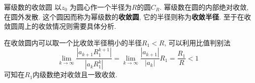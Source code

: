 \documentclass[fontset=windows, chinese, 10pt]{beamer}
\begin{document}
  \begin{frame}{幂级数的收敛圆}
  \small
以$z_0$ 为圆心作一个半径为$R$的圆$C_R$.
幂级数在圆的内部绝对收敛, 在圆外发散. 
这个圆因而称为幂级数的\textbf{收敛圆}, 
它的半径则称为\textbf{收敛半径}. 
至于在收敛圆周上的收敛情况则需要具体分析.

在收敛圆内可以取一个比收敛半径稍小的半径$R_1 < R$, 可以利用比值判别法
\begin{equation}
\lim_{k\to \infty} \frac{|a_{k+1}R_1^{k+1}|}{|a_kR_1^k|} = 
\lim_{k\to \infty} \frac{|a_{k+1}|}{|a_k|}R_1 = \frac{R_1}{R} < 1
\end{equation}
可知在$R_1$内级数绝对收敛且一致收敛.

  \end{frame}
  

      



\end{document}
